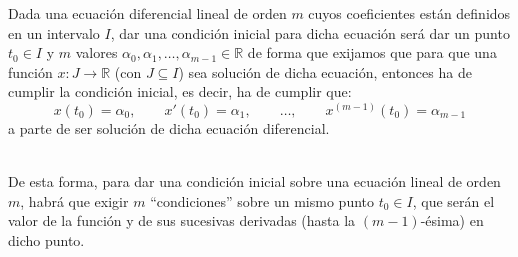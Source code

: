 \begin{definicion}
    Dada una ecuación diferencial lineal de orden $m$ cuyos coeficientes están definidos en un intervalo $I$, dar una condición inicial para dicha ecuación será dar un punto $t_0\in I$ y $m$ valores $\alpha_0,\alpha_1,\ldots,\alpha_{m-1}\in \mathbb{R}$ de forma que exijamos que para que una función $x:J\rightarrow\mathbb{R}$ (con $J\subseteq I$) sea solución de dicha ecuación, entonces ha de cumplir la condición inicial, es decir, ha de cumplir que:
    \begin{equation*}
        x(t_0) = \alpha_0, \qquad x'(t_0) = \alpha_1,\qquad  \ldots, \qquad  x^{(m-1)}(t_0) = \alpha_{m-1}
    \end{equation*}
    a parte de ser solución de dicha ecuación diferencial.
\end{definicion}~\\

De esta forma, para dar una condición inicial sobre una ecuación lineal de orden $m$, habrá que exigir $m$ ``condiciones'' sobre un mismo punto $t_0\in I$, que serán el valor de la función y de sus sucesivas derivadas (hasta la $(m-1)$-ésima) en dicho punto.

